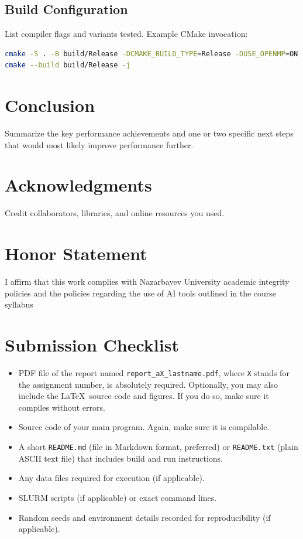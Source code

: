 \documentclass[11pt,a4paper]{article}
\newcommand{\honor}{I affirm that this work complies with Nazarbayev University academic integrity policies and the policies regarding the use of AI tools outlined in the course syllabus}
\begin{document}
\subsection{Build Configuration}
List compiler flags and variants tested. Example CMake invocation:
\begin{lstlisting}[language=bash,caption={CMake build variants.}]
cmake -S . -B build/Release -DCMAKE_BUILD_TYPE=Release -DUSE_OPENMP=ON
cmake --build build/Release -j
\end{lstlisting}

\section{Conclusion}
Summarize the key performance achievements and one or two specific next steps that would most likely improve performance further.

\section*{Acknowledgments}
Credit collaborators, libraries, and online resources you used.

\section*{Honor Statement}
\honor

\printbibliography

\section*{Submission Checklist}
\begin{itemize}
  \item PDF file of the report named \texttt{report\_aX\_lastname.pdf}, where \texttt{X} stands for the assignment number, is absolutely required. 
  Optionally, you may also include the \LaTeX~source code and figures. If you do so, make sure it compiles without errors.
  \item Source code of your main program. Again, make sure it is compilable.
  \item A short \texttt{README.md} (file in Markdown format, preferred) or \texttt{README.txt} (plain ASCII text file) that includes build and run instructions.
  \item Any data files required for execution (if applicable).
  \item SLURM scripts (if applicable) or exact command lines.
  \item Random seeds and environment details recorded for reproducibility (if applicable).
\end{itemize}
\end{document}
